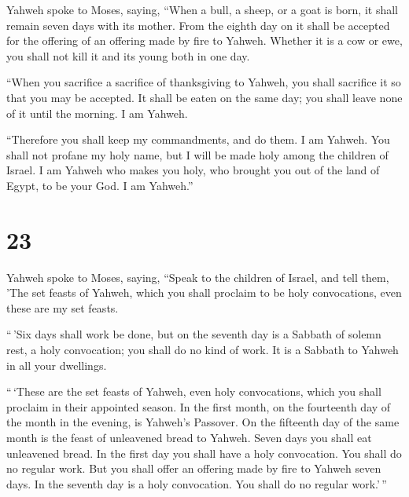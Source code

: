 Yahweh spoke to Moses, saying,  ``When a
bull, a sheep, or a goat is born, it shall remain seven days with its
mother. From the eighth day on it shall be accepted for the offering of
an offering made by fire to Yahweh.  Whether it is a cow
or ewe, you shall not kill it and its young both in one day.

 ``When you sacrifice a sacrifice of thanksgiving to
Yahweh, you shall sacrifice it so that you may be accepted.
 It shall be eaten on the same day; you shall leave none
of it until the morning. I am Yahweh.

 ``Therefore you shall keep my commandments, and do them.
I am Yahweh.  You shall not profane my holy name, but I
will be made holy among the children of Israel. I am Yahweh who makes
you holy,  who brought you out of the land of Egypt, to
be your God. I am Yahweh.''

\hypertarget{section-22}{%
\section{23}\label{section-22}}

 Yahweh spoke to Moses, saying,  ``Speak to
the children of Israel, and tell them, 'The set feasts of Yahweh, which
you shall proclaim to be holy convocations, even these are my set
feasts.

 ``\,'Six days shall work be done, but on the seventh day
is a Sabbath of solemn rest, a holy convocation; you shall do no kind of
work. It is a Sabbath to Yahweh in all your dwellings.

 ``\,`These are the set feasts of Yahweh, even holy
convocations, which you shall proclaim in their appointed season.
 In the first month, on the fourteenth day of the month in
the evening, is Yahweh's Passover.  On the fifteenth day
of the same month is the feast of unleavened bread to Yahweh. Seven days
you shall eat unleavened bread.  In the first day you
shall have a holy convocation. You shall do no regular work.
 But you shall offer an offering made by fire to Yahweh
seven days. In the seventh day is a holy convocation. You shall do no
regular work.'\,''

